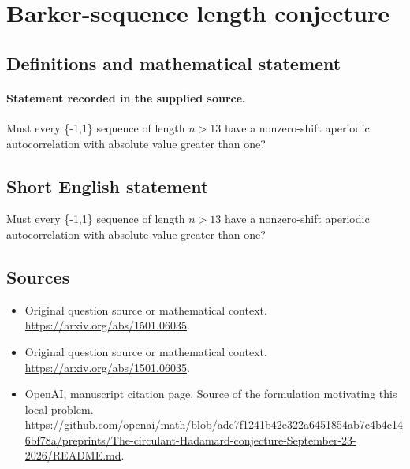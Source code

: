 \documentclass[11pt]{article}
\begin{document}
\section*{Barker-sequence length conjecture}\label{30007079}
\subsection{Definitions and mathematical statement}
\paragraph{Statement recorded in the supplied source.}
Must every \{-1,1\} sequence of length $n>13$ have a nonzero-shift aperiodic autocorrelation with absolute value greater than one?
\subsection{Short English statement}
Must every \{-1,1\} sequence of length $n>13$ have a nonzero-shift aperiodic autocorrelation with absolute value greater than one?
\subsection{Sources}
\begin{itemize}
\item[S1] Original question source or mathematical context.
\url{https://arxiv.org/abs/1501.06035}.
\item[S2] Original question source or mathematical context.
\url{https://arxiv.org/abs/1501.06035}.
\item[S3] OpenAI, manuscript citation page. Source of the formulation motivating this local problem.
\url{https://github.com/openai/math/blob/adc7f1241b42e322a6451854ab7e4b4c146bf78a/preprints/The-circulant-Hadamard-conjecture-September-23-2026/README.md}.
\end{itemize}
\end{document}
